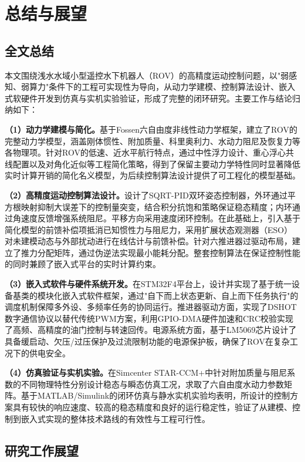 
\chapter{总结与展望}

\section{全文总结}

本文围绕浅水水域小型遥控水下机器人（ROV）的高精度运动控制问题，以"弱感知、弱算力"条件下的工程可实现性为导向，从动力学建模、控制算法设计、嵌入式软硬件开发到仿真与实机实验验证，形成了完整的闭环研究。主要工作与结论归纳如下：

\textbf{（1）动力学建模与简化。}基于Fossen六自由度非线性动力学框架，建立了ROV的完整动力学模型，涵盖刚体惯性、附加质量、科里奥利力、水动力阻尼及恢复力等各物理项。针对ROV的低速、近水平航行特点，通过中性浮力设计、重心浮心共线配置以及对角化近似等工程简化策略，得到了保留主要动力学特性同时显著降低实时计算开销的简化名义模型，为后续控制算法设计提供了可工程化的模型基础。

\textbf{（2）高精度运动控制算法设计。}设计了SQRT-PID双环姿态控制器，外环通过平方根映射抑制大误差下的控制量突变，结合积分抗饱和策略保证稳态精度；内环通过角速度反馈增强系统阻尼。平移方向采用速度闭环控制。在此基础上，引入基于简化模型的前馈补偿项抵消已知惯性力与阻尼力，采用扩展状态观测器（ESO）对未建模动态与外部扰动进行在线估计与前馈补偿。针对六推进器过驱动布局，建立了推力分配矩阵，通过伪逆法实现最小能耗分配。整套控制算法在保证控制性能的同时兼顾了嵌入式平台的实时计算约束。

\textbf{（3）嵌入式软件与硬件系统开发。}在STM32F4平台上，设计并实现了基于统一设备基类的模块化嵌入式软件框架，通过"自下而上状态更新、自上而下任务执行"的调度机制保障多外设、多频率任务的协同运行。推进器驱动方面，实现了DSHOT数字通信协议以替代传统PWM方案，利用GPIO-DMA硬件加速和CRC校验实现了高频、高精度的油门控制与转速回传。电源系统方面，基于LM5069芯片设计了具备缓启动、欠压/过压保护及过流限制功能的电源保护板，确保了ROV在复杂工况下的供电安全。

\textbf{（4）仿真验证与实机实验。}在Simcenter STAR-CCM+中针对附加质量与阻尼系数的不同物理特性分别设计稳态与瞬态仿真工况，求取了六自由度水动力参数矩阵。基于MATLAB/Simulink的闭环仿真与静水实机实验均表明，所设计的控制方案具有较快的响应速度、较高的稳态精度和良好的运行稳定性，验证了从建模、控制到嵌入式实现的整体技术路线的有效性与工程可行性。

\section{研究工作展望}


